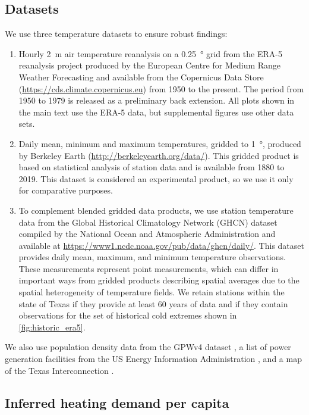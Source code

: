 \documentclass[12pt]{iopart}
\begin{document}
\subsection{Datasets}

We use three temperature datasets to ensure robust findings:
\begin{enumerate}
  \item Hourly \SI{2}{\meter} air temperature reanalysis on a \SI{0.25}{\degree} grid from the ERA-5 reanalysis project produced by the European Centre for Medium Range Weather Forecasting \cite{hersbach_era5:2020} and available  from the Copernicus Data Store (\url{https://cds.climate.copernicus.eu}) from 1950 to the present.
        The period from 1950 to 1979 is released as a preliminary back extension.
        All plots shown in the main text use the ERA-5 data, but supplemental figures use other data sets.
  \item Daily mean, minimum and maximum temperatures, gridded to \SI{1}{\degree}, produced by Berkeley Earth (\url{http://berkeleyearth.org/data/}).
        This gridded product is based on statistical analysis of station data and is available from 1880 to 2019.
        This dataset is considered an experimental product, so we use it only for comparative purposes.
  \item To complement blended gridded data products, we use station temperature data from the Global Historical Climatology Network (GHCN) dataset compiled by the National Ocean and Atmospheric Administration \cite{Menne:2012hk} and available at \url{https://www1.ncdc.noaa.gov/pub/data/ghcn/daily/}.
        This dataset provides daily mean, maximum, and minimum temperature observations.
        These measurements represent point measurements, which can differ in important ways from gridded products describing spatial averages due to the spatial heterogeneity of temperature fields.
        We retain stations within the state of Texas if they provide at least 60 years of data and if they contain observations for the set of historical cold extremes shown in \cref{fig:historic_era5}.
\end{enumerate}
We also use population density data from the GPWv4 dataset \cite{ciesin_gpwv4:2016}, a list of power generation facilities from the US Energy Information Administration \cite{useia_generators:2021}, and a map of the Texas Interconnection \cite{useia_regions:2021}.


\subsection{Inferred heating demand per capita}\label{sec:inferred-demand}
\end{document}
